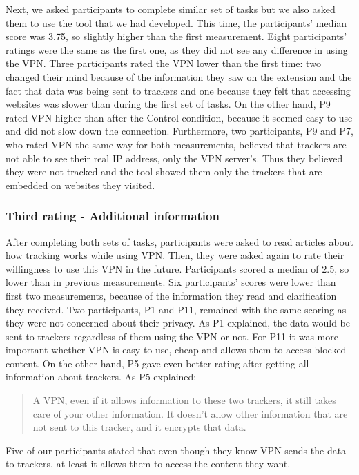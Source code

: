 Next, we asked participants to complete similar set of tasks but we also asked them to use the tool that we had developed. This time, the participants' median score was  3.75, so slightly higher than the first measurement. Eight participants' ratings were the same as the first one, as they did not see any difference in using the VPN. Three participants rated the VPN lower than the first time: two changed their mind because of the information they saw on the extension and the fact that data was being sent to trackers and one because they felt that accessing websites was slower than during the first set of tasks.  On the other hand, P9 rated VPN higher than after the Control condition, because it seemed easy to use and did not slow down the connection.  Furthermore, two participants, P9 and P7, who rated VPN the same way for both measurements, believed that trackers are not able to see their real IP address, only the VPN server’s. Thus they believed they were not tracked and the tool showed them only the trackers that are embedded on websites they visited. 

\subsubsection{Third rating - Additional information} 

After completing both sets of tasks, participants were asked to read articles about how tracking works while using VPN. Then, they were asked again to rate their willingness to use this VPN in the future. Participants scored a median of 2.5, so lower than in previous measurements. Six participants' scores were lower than first two measurements, because of the information they read and clarification they received. Two participants, P1 and P11, remained with the same scoring as they were not concerned about their privacy. As P1 explained, the data would be sent to trackers regardless of them using the VPN or not. For P11 it was more important whether VPN is easy to use, cheap and allows them to access blocked content. On the other hand, P5 gave even better rating after getting all information about trackers. As P5 explained:

\begin{quote}A VPN, even if it allows information to these two trackers, it still takes care of your other information. It doesn't allow other information that are not sent to this tracker, and it encrypts that data.\end{quote}
Five of our participants stated that even though they know VPN sends the data to trackers, at least it allows them to access the content they want.   


